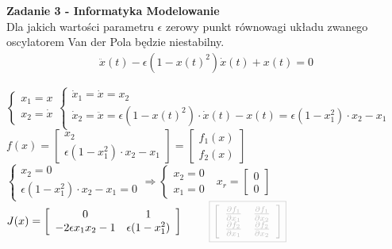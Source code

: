\documentclass[a4paper,11pt]{article}
\begin{document}
\newpage
\begin{framed}
\textbf{Zadanie 3 - Informatyka Modelowanie } \\ 
Dla jakich wartości parametru \( \epsilon \) zerowy punkt równowagi układu zwanego oscylatorem Van der Pola będzie niestabilny.  
\begin{align*}
\ddot{x}(t)- \epsilon ( 1-x(t)^{2})\dot{x}(t)+x(t) = 0
\end{align*}
\end{framed}
$\begin{cases} x_1=x \\ x_2 =\dot{x} \end{cases} \begin{cases} \dot{x}_1=\dot{x}=x_2 \\ \dot{x}_2=\ddot{x}= \epsilon(1-x(t)^2) \cdot \dot{x}(t)-x(t)=\epsilon(1-x_1^2) \cdot x_2 - x_1 \end{cases}$\\
$f(x)=\left[ \begin{array}{c}   x_2  \\  \epsilon(1-x_1^2) \cdot x_2 - x_1  \end{array}\right] = \left[ \begin{array}{c}  f_1(x)   \\ f_2(x)   \end{array}\right]$\\
$\begin{cases} x_2=0 \\ \epsilon(1-x_1^2) \cdot x_2 - x_1 = 0\end {cases} \Rightarrow \begin{cases}x_2=0 \\ x_1 = 0 \end {cases} \ \ \ x_r = \left[ \begin{array}{c}     0\\0   \end{array}\right]$\\
$J(x)=\left[ \begin{array}{cc}   0 &1  \\ -2\epsilon x_1 x_2 -1 & \epsilon(1-x_1^2)   \end{array}\right] \ \ \ \ \ \ \ 
{\color{lightgray}\boxed{\left[ \begin{array}{cc}    \frac{\partial f_1}{\partial x_1} &\frac{\partial f_1}{\partial x_2} \\ \frac{\partial f_2}{\partial x_1} & \frac{\partial f_2}{\partial x_2}   \end{array}\right]}}$\\
\end{document}
